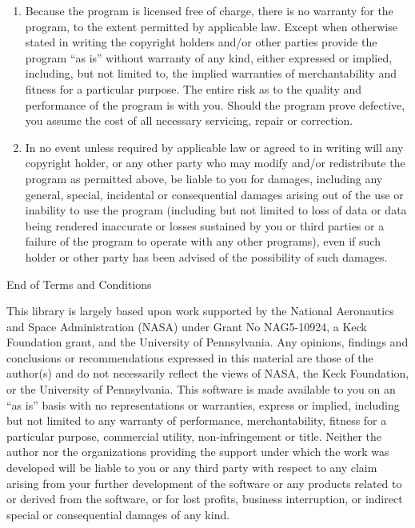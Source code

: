 \documentclass[twoside,letterpaper,11pt]{article}
\begin{document}
\begin{enumerate}
\begin{center}
{\Large\sc
No Warranty
}
\end{center}

\item
{\sc Because the program is licensed free of charge, there is no warranty
for the program, to the extent permitted by applicable law.  Except when
otherwise stated in writing the copyright holders and/or other parties
provide the program ``as is'' without warranty of any kind, either expressed
or implied, including, but not limited to, the implied warranties of
merchantability and fitness for a particular purpose.  The entire risk as
to the quality and performance of the program is with you.  Should the
program prove defective, you assume the cost of all necessary servicing,
repair or correction.}

\item
{\sc In no event unless required by applicable law or agreed to in writing
will any copyright holder, or any other party who may modify and/or
redistribute the program as permitted above, be liable to you for damages,
including any general, special, incidental or consequential damages arising
out of the use or inability to use the program (including but not limited
to loss of data or data being rendered inaccurate or losses sustained by
you or third parties or a failure of the program to operate with any other
programs), even if such holder or other party has been advised of the
possibility of such damages.}

\end{enumerate}


\begin{center}
{\Large\sc End of Terms and Conditions}
\end{center}

This library is largely based upon work supported by the 
National Aeronautics and Space Administration (NASA) under Grant No 
NAG5-10924, a Keck Foundation grant, and the University of Pennsylvania. 
Any opinions, findings and conclusions or recommendations expressed in this 
material are those of the author(s) and do not necessarily reflect the views 
of NASA, the Keck Foundation, or the University of Pennsylvania.
This software is made available to you on an ``as is'' basis with no 
representations or warranties, express or implied, including but not 
limited to any warranty of performance, merchantability, fitness for a 
particular purpose, commercial utility, non-infringement or title.  
Neither the author nor the organizations providing the support under 
which the work was developed will be liable to you or any third party 
with respect to any claim arising from your further development of the 
software or any products related to or derived from the software, or for 
lost profits, business interruption, or indirect special or consequential 
damages of any kind. 
\end{document}
